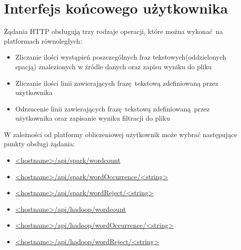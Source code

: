 \section{Interfejs końcowego użytkownika}
Żądania HTTP obsługują trzy rodzaje operacji, które można wykonać na platformach równoległych:
\begin{itemize}
	\item {Zliczanie ilości wystąpień poszczególnych fraz tekstowych(oddzielonych spacją) znalezionych w źródle danych oraz zapisu wyniku do pliku}
	\item {Zliczanie ilości linii zawierających frazę tekstową zdefiniowaną przez użytkownika}
	\item {Odrzucenie linii zawierających frazę tekstową zdefiniowaną przez użytkownika oraz zapisanie wyniku filtracji do pliku}
\end{itemize}
W zależności od platformy obliczeniowej użytkownik może wybrać następujące punkty obsługi żądania:
\begin{itemize}
	\item{\url{<hostname>/api/spark/wordcount}}
	\item{\url{<hostname>/api/spark/wordOccurrence/<string> }}
	\item{\url{<hostname>/api/spark/wordReject/<string> }}
	\item{\url{<hostname>/api/hadoop/wordcount}}
	\item{\url{<hostname>/api/hadoop/wordOccurrence/<string>}}
	\item{\url{<hostname>/api/hadoop/wordReject/<string> }}
\end{itemize}





